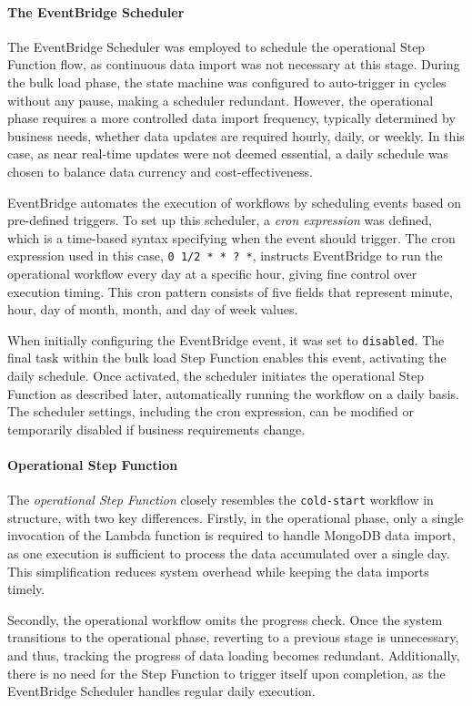 \paragraph{The EventBridge Scheduler}
The EventBridge Scheduler was employed to schedule the operational Step Function flow, as continuous data import was not necessary at this stage. During the bulk load phase, the state machine was configured to auto-trigger in cycles without any pause, making a scheduler redundant. However, the operational phase requires a more controlled data import frequency, typically determined by business needs, whether data updates are required hourly, daily, or weekly. In this case, as near real-time updates were not deemed essential, a daily schedule was chosen to balance data currency and cost-effectiveness.

EventBridge automates the execution of workflows by scheduling events based on pre-defined triggers. To set up this scheduler, a \textit{cron expression} was defined, which is a time-based syntax specifying when the event should trigger. The cron expression used in this case, \texttt{0 1/2 * * ? *}, instructs EventBridge to run the operational workflow every day at a specific hour, giving fine control over execution timing. This cron pattern consists of five fields that represent minute, hour, day of month, month, and day of week values. 

When initially configuring the EventBridge event, it was set to \texttt{disabled}. The final task within the bulk load Step Function enables this event, activating the daily schedule. Once activated, the scheduler initiates the operational Step Function as described later, automatically running the workflow on a daily basis. The scheduler settings, including the cron expression, can be modified or temporarily disabled if business requirements change.

\paragraph{Operational Step Function}
The \textit{operational Step Function} closely resembles the \texttt{cold-start} workflow in structure, with two key differences. Firstly, in the operational phase, only a single invocation of the Lambda function is required to handle MongoDB data import, as one execution is sufficient to process the data accumulated over a single day. This simplification reduces system overhead while keeping the data imports timely.

Secondly, the operational workflow omits the progress check. Once the system transitions to the operational phase, reverting to a previous stage is unnecessary, and thus, tracking the progress of data loading becomes redundant. Additionally, there is no need for the Step Function to trigger itself upon completion, as the EventBridge Scheduler handles regular daily execution.